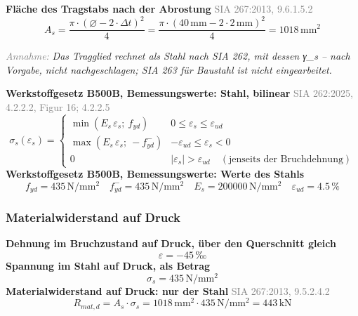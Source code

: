 \documentclass[11pt,a4paper]{article}
\newcommand{\normref}[1]{{\small\textcolor{gray}{#1}}}
\newcommand{\hinweis}[2]{\par\noindent\textcolor{gray}{\textit{#1:}} \textit{#2}\par}
\begin{document}
\noindent\textbf{Fläche des Tragstabs nach der Abrostung} \hfill \normref{SIA 267:2013, 9.6.1.5.2}
\begin{equation*}
A_s = \frac{\pi \cdot \left(\varnothing - 2 \cdot \Delta t\right)^{2}}{4} = \frac{\pi \cdot \left(40\,\mathrm{mm} - 2 \cdot 2\,\mathrm{mm}\right)^{2}}{4} = 1018\,\mathrm{mm}^{2}
\end{equation*}
\hinweis{Annahme}{Das Tragglied rechnet als Stahl nach SIA 262, mit dessen γ\_s -- nach Vorgabe, nicht nachgeschlagen; SIA 263 für Baustahl ist nicht eingearbeitet.}
\noindent\textbf{Werkstoffgesetz B500B, Bemessungswerte: Stahl, bilinear} \hfill \normref{SIA 262:2025, 4.2.2.2, Figur 16; 4.2.2.5}
\begin{equation*}
\sigma_s(\varepsilon_s) = \begin{cases} \min(E_s\,\varepsilon_s;\ f_{yd}) & 0 \le \varepsilon_s \le \varepsilon_{ud} \\[1ex] \max(E_s\,\varepsilon_s;\ -f_{yd}^{-}) & -\varepsilon_{ud} \le \varepsilon_s < 0 \\[1ex] 0 & |\varepsilon_s| > \varepsilon_{ud} \quad (\text{jenseits der Bruchdehnung}) \end{cases}
\end{equation*}
\noindent\textbf{Werkstoffgesetz B500B, Bemessungswerte: Werte des Stahls}
\begin{equation*}
f_{yd} = 435\,\mathrm{N}/\mathrm{mm}^{2} \quad f_{yd}^{-} = 435\,\mathrm{N}/\mathrm{mm}^{2} \quad E_s = 200000\,\mathrm{N}/\mathrm{mm}^{2} \quad \varepsilon_{ud} = 4.5\,\%
\end{equation*}
\subsubsection{Materialwiderstand auf Druck}
\noindent\textbf{Dehnung im Bruchzustand auf Druck, über den Querschnitt gleich}
\begin{equation*}
\varepsilon = -45\,\text{‰}
\end{equation*}
\noindent\textbf{Spannung im Stahl auf Druck, als Betrag}
\begin{equation*}
\sigma_s = 435\,\mathrm{N}/\mathrm{mm}^{2}
\end{equation*}
\noindent\textbf{Materialwiderstand auf Druck: nur der Stahl} \hfill \normref{SIA 267:2013, 9.5.2.4.2}
\begin{equation*}
R_{mat,d} = A_s \cdot \sigma_s = 1018\,\mathrm{mm}^{2} \cdot 435\,\mathrm{N}/\mathrm{mm}^{2} = 443\,\mathrm{kN}
\end{equation*}
\end{document}
